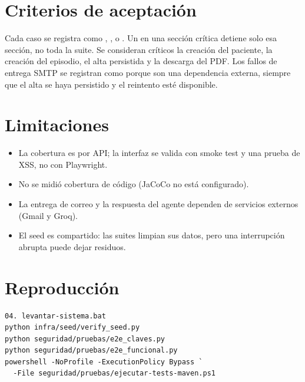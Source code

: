 \documentclass[11pt]{article}
\begin{document}
\section{Criterios de aceptación}

Cada caso se registra como \ok{}, \fallo{}, \aviso{} o \omitido{}.
Un \fallo{} en una sección crítica detiene solo esa sección, no toda la suite.
Se consideran críticos la creación del paciente, la creación del episodio,
el alta persistida y la descarga del PDF. Los fallos de entrega SMTP se
registran como \aviso{} porque son una dependencia externa, siempre que el alta
se haya persistido y el reintento esté disponible.

\section{Limitaciones}

\begin{itemize}
  \item La cobertura es por API; la interfaz se valida con smoke test y una
  prueba de XSS, no con Playwright.
  \item No se midió cobertura de código (JaCoCo no está configurado).
  \item La entrega de correo y la respuesta del agente dependen de servicios
  externos (Gmail y Groq).
  \item El seed es compartido: las suites limpian sus datos, pero una
  interrupción abrupta puede dejar residuos.
\end{itemize}

\section{Reproducción}

\begin{verbatim}
04. levantar-sistema.bat
python infra/seed/verify_seed.py
python seguridad/pruebas/e2e_claves.py
python seguridad/pruebas/e2e_funcional.py
powershell -NoProfile -ExecutionPolicy Bypass `
  -File seguridad/pruebas/ejecutar-tests-maven.ps1
\end{verbatim}
\end{document}
